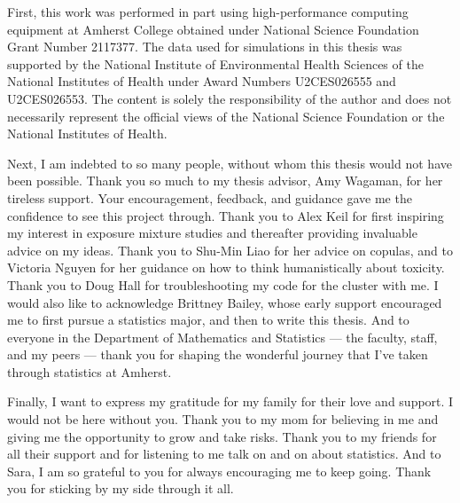 \documentclass[12pt, twoside]{amherstthesis}
\begin{document}
  \begin{acknowledgments}
    First, this work was performed in part using high-performance computing equipment at Amherst College obtained under National Science Foundation Grant Number 2117377. The data used for simulations in this thesis was supported by the National Institute of Environmental Health Sciences of the National Institutes of Health under Award Numbers U2CES026555 and U2CES026553. The content is solely the responsibility of the author and does not necessarily represent the official views of the National Science Foundation or the National Institutes of Health.

    Next, I am indebted to so many people, without whom this thesis would not have been possible. Thank you so much to my thesis advisor, Amy Wagaman, for her tireless support. Your encouragement, feedback, and guidance gave me the confidence to see this project through. Thank you to Alex Keil for first inspiring my interest in exposure mixture studies and thereafter providing invaluable advice on my ideas. Thank you to Shu-Min Liao for her advice on copulas, and to Victoria Nguyen for her guidance on how to think humanistically about toxicity. Thank you to Doug Hall for troubleshooting my code for the cluster with me. I would also like to acknowledge Brittney Bailey, whose early support encouraged me to first pursue a statistics major, and then to write this thesis. And to everyone in the Department of Mathematics and Statistics --- the faculty, staff, and my peers --- thank you for shaping the wonderful journey that I've taken through statistics at Amherst.

    Finally, I want to express my gratitude for my family for their love and support. I would not be here without you. Thank you to my mom for believing in me and giving me the opportunity to grow and take risks. Thank you to my friends for all their support and for listening to me talk on and on about statistics. And to Sara, I am so grateful to you for always encouraging me to keep going. Thank you for sticking by my side through it all.
  \end{acknowledgments}

  \hypersetup{linkcolor=black}
  \setcounter{tocdepth}{2}
  \tableofcontents

  \listoftables

  \listoffigures


\mainmatter %
\pagestyle{fancyplain} %
\end{document}
